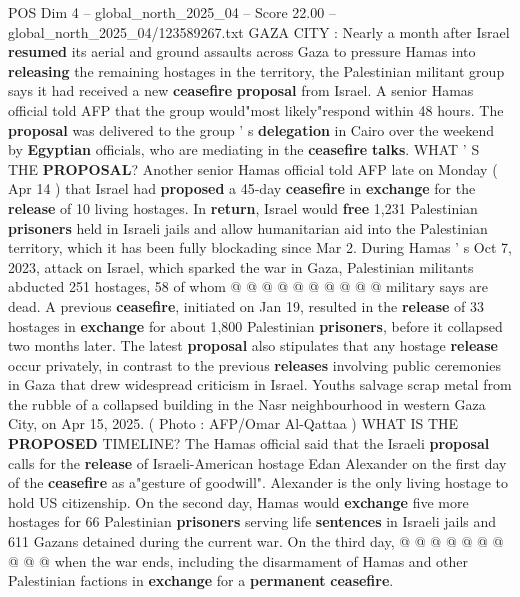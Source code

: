 \begin{textsample}{POS Dim 4 – global\_north\_2025\_04 – Score 22.00 – global\_north\_2025\_04/123589267.txt}  \label{ex:f4_pos_226}
GAZA CITY : Nearly a month after Israel \textbf{resumed} its aerial and ground assaults across Gaza to pressure Hamas into \textbf{releasing} the remaining hostages in the territory, the Palestinian militant group says it had received a new \textbf{ceasefire} \textbf{proposal} from Israel.
A senior Hamas official told AFP that the group would"most likely"respond within 48 hours.
The \textbf{proposal} was delivered to the group ' s \textbf{delegation} in Cairo over the weekend by \textbf{Egyptian} officials, who are mediating in the \textbf{ceasefire} \textbf{talks}.
WHAT ' S THE \textbf{PROPOSAL}?
Another senior Hamas official told AFP late on Monday ( Apr 14 ) that Israel had \textbf{proposed} a 45-day \textbf{ceasefire} in \textbf{exchange} for the \textbf{release} of 10 living hostages.
In \textbf{return}, Israel would \textbf{free} 1,231 Palestinian \textbf{prisoners} held in Israeli jails and allow humanitarian aid into the Palestinian territory, which it has been fully blockading since Mar 2.
During Hamas ' s Oct 7, 2023, attack on Israel, which sparked the war in Gaza, Palestinian militants abducted 251 hostages, 58 of whom @ @ @ @ @ @ @ @ @ @ military says are dead.
A previous \textbf{ceasefire}, initiated on Jan 19, resulted in the \textbf{release} of 33 hostages in \textbf{exchange} for about 1,800 Palestinian \textbf{prisoners}, before it collapsed two months later.
The latest \textbf{proposal} also stipulates that any hostage \textbf{release} occur privately, in contrast to the previous \textbf{releases} involving public ceremonies in Gaza that drew widespread criticism in Israel.
Youths salvage scrap metal from the rubble of a collapsed building in the Nasr neighbourhood in western Gaza City, on Apr 15, 2025. ( Photo : AFP/Omar Al-Qattaa ) WHAT IS THE \textbf{PROPOSED} TIMELINE?
The Hamas official said that the Israeli \textbf{proposal} calls for the \textbf{release} of Israeli-American hostage Edan Alexander on the first day of the \textbf{ceasefire} as a"gesture of goodwill".
Alexander is the only living hostage to hold US citizenship.
On the second day, Hamas would \textbf{exchange} five more hostages for 66 Palestinian \textbf{prisoners} serving life \textbf{sentences} in Israeli jails and 611 Gazans detained during the current war.
On the third day, @ @ @ @ @ @ @ @ @ @ when the war ends, including the disarmament of Hamas and other Palestinian factions in \textbf{exchange} for a \textbf{permanent} \textbf{ceasefire}.

\end{textsample}

